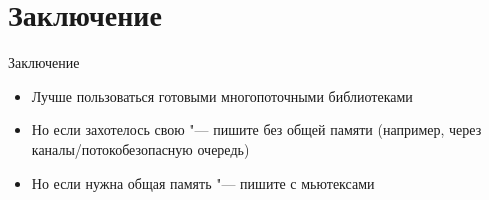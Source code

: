 \section{Заключение}

\begin{frame}{Заключение}
	\begin{itemize}
		\item Лучше пользоваться готовыми многопоточными библиотеками
		\item Но если захотелось свою "--- пишите без общей памяти (например, через каналы/потокобезопасную очередь)
		\item Но если нужна общая память "--- пишите с мьютексами
	\end{itemize}
\end{frame}
